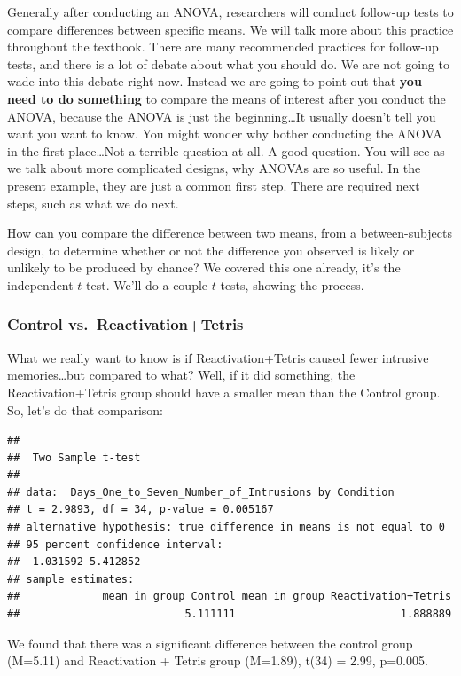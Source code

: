 \documentclass[]{book}
\begin{document}
Generally after conducting an ANOVA, researchers will conduct follow-up tests to compare differences between specific means. We will talk more about this practice throughout the textbook. There are many recommended practices for follow-up tests, and there is a lot of debate about what you should do. We are not going to wade into this debate right now. Instead we are going to point out that \textbf{you need to do something} to compare the means of interest after you conduct the ANOVA, because the ANOVA is just the beginning\ldots{}It usually doesn't tell you want you want to know. You might wonder why bother conducting the ANOVA in the first place\ldots{}Not a terrible question at all. A good question. You will see as we talk about more complicated designs, why ANOVAs are so useful. In the present example, they are just a common first step. There are required next steps, such as what we do next.

How can you compare the difference between two means, from a between-subjects design, to determine whether or not the difference you observed is likely or unlikely to be produced by chance? We covered this one already, it's the independent \(t\)-test. We'll do a couple \(t\)-tests, showing the process.

\hypertarget{control-vs.reactivationtetris}{%
\subsubsection{Control vs.~Reactivation+Tetris}\label{control-vs.reactivationtetris}}

What we really want to know is if Reactivation+Tetris caused fewer intrusive memories\ldots{}but compared to what? Well, if it did something, the Reactivation+Tetris group should have a smaller mean than the Control group. So, let's do that comparison:

\begin{verbatim}
## 
## 	Two Sample t-test
## 
## data:  Days_One_to_Seven_Number_of_Intrusions by Condition
## t = 2.9893, df = 34, p-value = 0.005167
## alternative hypothesis: true difference in means is not equal to 0
## 95 percent confidence interval:
##  1.031592 5.412852
## sample estimates:
##             mean in group Control mean in group Reactivation+Tetris 
##                          5.111111                          1.888889
\end{verbatim}

We found that there was a significant difference between the control group (M=5.11) and Reactivation + Tetris group (M=1.89), t(34) = 2.99, p=0.005.
\end{document}
